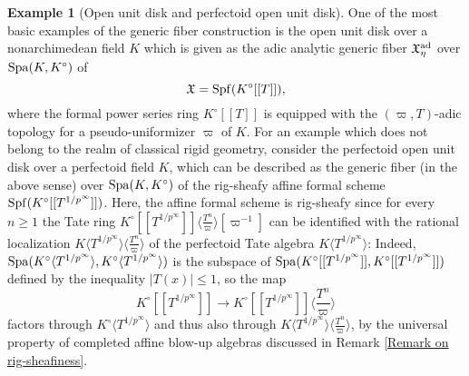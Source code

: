 \documentclass[12pt,twoside,a4paper]{article}
\theoremstyle{definition}
\newtheorem{example}[thm]{Example}
\theoremstyle{remark}
\newcommand\ad{{\rm ad}}
\newcommand\Spa{{\rm Spa}}
\newcommand\Spf{{\rm Spf}}
\begin{document}
\begin{example}[Open unit disk and perfectoid open unit disk]\label{Open unit disk}One of the most basic examples of the generic fiber construction is the open unit disk over a nonarchimedean field $K$ which is given as the adic analytic generic fiber $\mathfrak{X}_{\eta}^{\ad}$ over $\Spa(K, K^{\circ})$ of \begin{equation*}\mathfrak{X}=\Spf(K^{\circ}[[T]]),\end{equation*}where the formal power series ring $K^{\circ}[[T]]$ is equipped with the $(\varpi, T)$-adic topology for a pseudo-uniformizer $\varpi$ of $K$. For an example which does not belong to the realm of classical rigid geometry, consider the perfectoid open unit disk over a perfectoid field $K$, which can be described as the generic fiber (in the above sense) over $\Spa(K, K^{\circ})$ of the rig-sheafy affine formal scheme $\Spf(K^{\circ}[[T^{1/p^{\infty}}]])$. Here, the affine formal scheme is rig-sheafy since for every $n\geq1$ the Tate ring $K^{\circ}[[T^{1/p^{\infty}}]]\langle\frac{T^{n}}{\varpi}\rangle[\varpi^{-1}]$ can be identified with the rational localization $K\langle T^{1/p^{\infty}}\rangle\langle\frac{T^{n}}{\varpi}\rangle$ of the perfectoid Tate algebra $K\langle T^{1/p^{\infty}}\rangle$: Indeed, $\Spa(K^{\circ}\langle T^{1/p^{\infty}}\rangle, K^{\circ}\langle T^{1/p^{\infty}}\rangle)$ is the subspace of $\Spa(K^{\circ}[[T^{1/p^{\infty}}]], K^{\circ}[[T^{1/p^{\infty}}]])$ defined by the inequality $\vert T(x)\vert \leq1$, so the map \begin{equation*}K^{\circ}[[T^{1/p^{\infty}}]]\to K^{\circ}[[T^{1/p^{\infty}}]]\langle\frac{T^{n}}{\varpi}\rangle\end{equation*}factors through $K^{\circ}\langle T^{1/p^{\infty}}\rangle$ and thus also through $K\langle T^{1/p^{\infty}}\rangle\langle\frac{T^{n}}{\varpi}\rangle$, by the universal property of completed affine blow-up algebras discussed in Remark \ref{Remark on rig-sheafiness}.\end{example}
\end{document}

